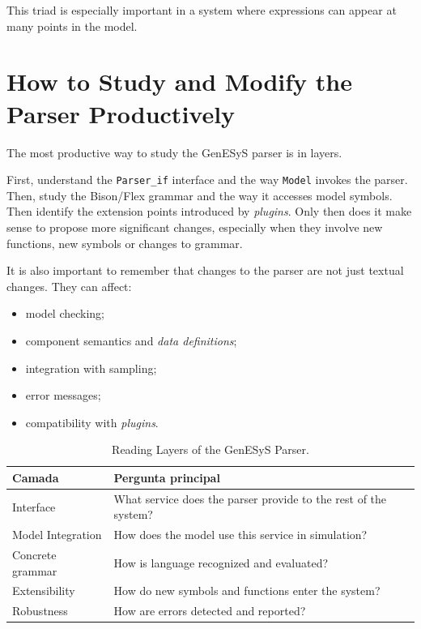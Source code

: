 This triad is especially important in a system where expressions can appear at many points in the model.

\section{How to Study and Modify the Parser Productively}
\label{sec:cap9_como_estudar_modificar_parser}

The most productive way to study the GenESyS parser is in layers.

First, understand the \texttt{Parser\_if} interface and the way \texttt{Model} invokes the parser. Then, study the Bison/Flex grammar and the way it accesses model symbols. Then identify the extension points introduced by \textit{plugins}. Only then does it make sense to propose more significant changes, especially when they involve new functions, new symbols or changes to grammar.

It is also important to remember that changes to the parser are not just textual changes. They can affect:
\begin{itemize}
 \item model checking;
 \item component semantics and \textit{data definitions};
 \item integration with sampling;
 \item error messages;
 \item compatibility with \textit{plugins}.
\end{itemize}

\begin{table}[htbp]
 \centering
 \caption{Reading Layers of the GenESyS Parser.}
 \label{tab:cap9_camadas_leitura_parser}
 \small
 \begin{tabular}{|p{3.5cm}|p{6.8cm}|}
 \hline
 \textbf{Camada} & \textbf{Pergunta principal} \\
 \hline
 Interface & What service does the parser provide to the rest of the system? \\
 \hline
 Model Integration & How does the model use this service in simulation? \\
 \hline
 Concrete grammar & How is language recognized and evaluated? \\
 \hline
 Extensibility & How do new symbols and functions enter the system? \\
 \hline
 Robustness & How are errors detected and reported? \\
 \hline
 \end{tabular}
\end{table}

